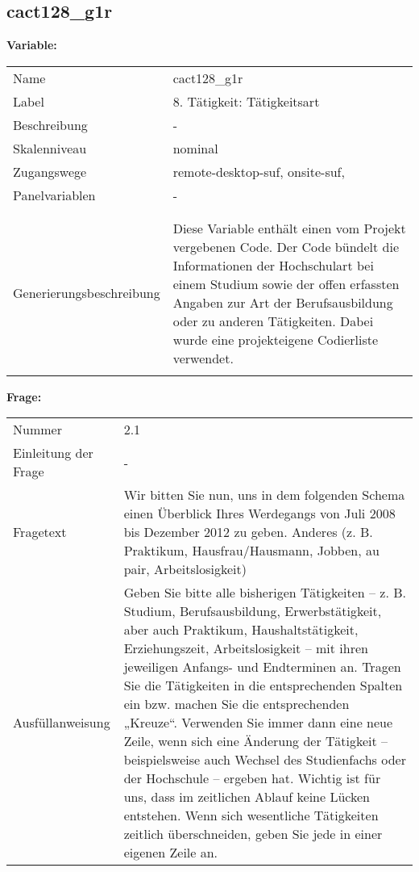 	
	
	\subsection{cact128\_g1r}
	\label{subSection:cact128_g1r}

	\noindent\textbf{Variable:}\\
		\begin{tabular}{lL{11.3cm}}
			\label{tableVariable:cact128_g1r}
			Name & cact128\_g1r \\
			Label & 8. Tätigkeit: Tätigkeitsart \\
			Beschreibung & - \\
			Skalenniveau & nominal \\
			Zugangswege &
				remote-desktop-suf,
				onsite-suf,
 \\
			Panelvariablen & -
			 \\
			 \\
 \\
					Generierungsbeschreibung & Diese Variable enthält einen vom Projekt vergebenen Code. Der Code bündelt die  Informationen der Hochschulart bei einem Studium sowie der  offen erfassten Angaben zur Art der Berufsausbildung oder zu anderen Tätigkeiten. Dabei wurde eine projekteigene Codierliste verwendet.
				 \\	
			 \\
		\end{tabular}

		\vspace*{1 cm}
		\noindent\textbf{Frage:}\\
		\begin{tabular}{lL{11.3cm}}
			\label{tableQuestion:cact128_g1r}
			Nummer & 2.1 \\
			Einleitung der Frage & - \\
			Fragetext & Wir bitten Sie nun, uns in dem folgenden Schema einen Überblick Ihres Werdegangs von Juli 2008 bis Dezember 2012 zu geben.
Anderes
(z. B. Praktikum, Hausfrau/Hausmann, Jobben, au pair, Arbeitslosigkeit) \\
			Ausfüllanweisung & Geben Sie bitte alle bisherigen Tätigkeiten – z. B. Studium, Berufsausbildung, Erwerbstätigkeit, aber auch Praktikum, Haushaltstätigkeit,
Erziehungszeit, Arbeitslosigkeit – mit ihren jeweiligen Anfangs- und Endterminen an. Tragen Sie die Tätigkeiten in die entsprechenden Spalten ein bzw. machen Sie die entsprechenden „Kreuze“. Verwenden Sie immer dann eine neue Zeile, wenn sich eine Änderung der Tätigkeit – beispielsweise auch Wechsel des Studienfachs oder der Hochschule – ergeben hat. Wichtig ist für uns, dass im zeitlichen Ablauf keine Lücken entstehen. Wenn sich wesentliche Tätigkeiten zeitlich überschneiden, geben Sie jede in einer eigenen Zeile an. \\
		\end{tabular}





